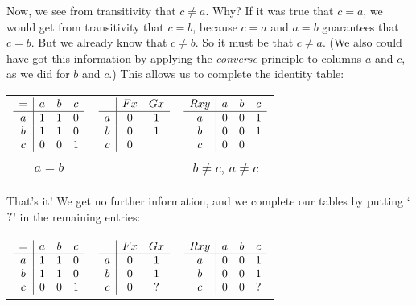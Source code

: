 \documentclass[PHIL101-Textbook.tex]{subfiles}
\begin{document}
\noindent Now, we see from transitivity that $c \neq a$. Why? If it was true that $c = a$, we would get from transitivity that $c = b$, because $c = a$ and $a = b$ guarantees that $c = b$. But we already know that $c \neq b$. So it must be that $c \neq a$.
(We also could have got this information by applying the \emph{converse} principle to columns $a$ and $c$, as we did for $b$ and $c$.)
This allows us to complete the identity table: 

\begin{center}
  \begin{tabular}{ccc}
   $\begin{array}{c|ccc}
	   = & a & b & c\\ \hline
	   a & 1 & 1 & 0\\
	   b & 1 & 1 & 0\\
	   c & 0 & 0 & 1
	\end{array}$
	 &
   $\begin{array}{c|cc}
	  & \mathord{F}{x} & \mathord{G}{x}\\ \hline
	  a & 0 & 1 \\
	  b & 0 & 1 \\
	  c & 0 &
	\end{array}$
	 &
   $\begin{array}{c|ccc}
	  \mathord{R}{xy} & a & b & c\\ \hline
	  a & 0& 0 & 1 \\
	  b & 0& 0 & 1 \\
	  c & 0& 0 & 
	\end{array}$\\
	$a=b$ && $b\neq c$, $a\neq c$
  \end{tabular}
\end{center}

\noindent That's it! We get no further information, and we complete our tables by putting `$?$' in the remaining entries: 

\begin{center}
  \begin{tabular}{ccc}
   $\begin{array}{c|ccc}
	   = & a & b & c\\ \hline
	   a & 1 & 1 & 0\\
	   b & 1 & 1 & 0\\
	   c & 0 &0 & 1
	\end{array}$
		 &
		   $\begin{array}{c|cc}
			  & \mathord{F}{x} & \mathord{G}{x}\\ \hline
			  a & 0 & 1 \\
			  b & 0 & 1 \\
			  c & 0 & ?
			\end{array}$
					
			 &
			   $\begin{array}{c|ccc}
				  \mathord{R}{xy} & a & b & c\\ \hline
				  a & 0& 0 & 1 \\
				 b & 0& 0 & 1 \\
				c & 0&0 & ?
				\end{array}$
  \end{tabular}
\end{center}
\end{document}
